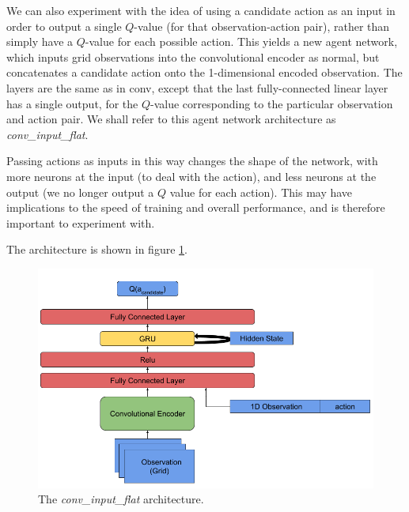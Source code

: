 We can also experiment with the idea of using a candidate action as an input in order to output a single $Q$-value (for that observation-action pair), rather than simply have a $Q$-value for each possible action. This yields a new agent network, which inputs grid observations into the convolutional encoder as normal, but concatenates a candidate action onto the 1-dimensional encoded observation. The layers are the same as in conv, except that the last fully-connected linear layer has a single output, for the $Q$-value corresponding to the particular observation and action pair. We shall refer to this agent network architecture as \textit{conv\_input\_flat}. 

Passing actions as inputs in this way changes the shape of the network, with more neurons at the input (to deal with the action), and less neurons at the output (we no longer output a $Q$ value for each action). This may have implications to the speed of training and overall performance, and is therefore important to experiment with. 

The architecture is shown in figure \ref{fig:conv_input_flat_diagram}.

\begin{figure}
    \centering
    \includegraphics[scale=0.45]{images/agent_diagrams/rnn_mathias_agent_diagram.png}
    \caption{The \textit{conv\_input\_flat} architecture.}
    \label{fig:conv_input_flat_diagram}
\end{figure}


